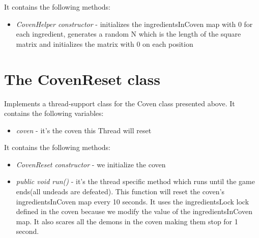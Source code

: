 \documentclass[14pt]{article}
\begin{document}
It contains the following methods:\\
\begin{itemize}
            \item \textit{CovenHelper constructor} - initializes the ingredientsInCoven map with 0 for each ingredient, generates a random N which is the length of the square matrix and initializes the matrix with 0 on each position
\end{itemize}

\section*{The CovenReset class}
\vspace{5 mm}
Implements a thread-support class for the Coven class presented above.
It contains the following variables:\\ 
\begin{itemize}
            \item \textit{coven} - it's the coven this Thread will reset 
\end{itemize}

It contains the following methods:\\
\begin{itemize}
            \item \textit{CovenReset constructor} - we initialize the coven
            \item \textit{public void run()} - it's the thread specific method which runs until the game ends(all undeads are defeated). This function will reset the coven's ingredientsInCoven map every 10 seconds. It uses the ingredientsLock lock defined in the coven because we modify the value of the ingredientsInCoven map. It also scares all the demons in the coven making them stop for 1 second.
\end{itemize}
\end{document}
